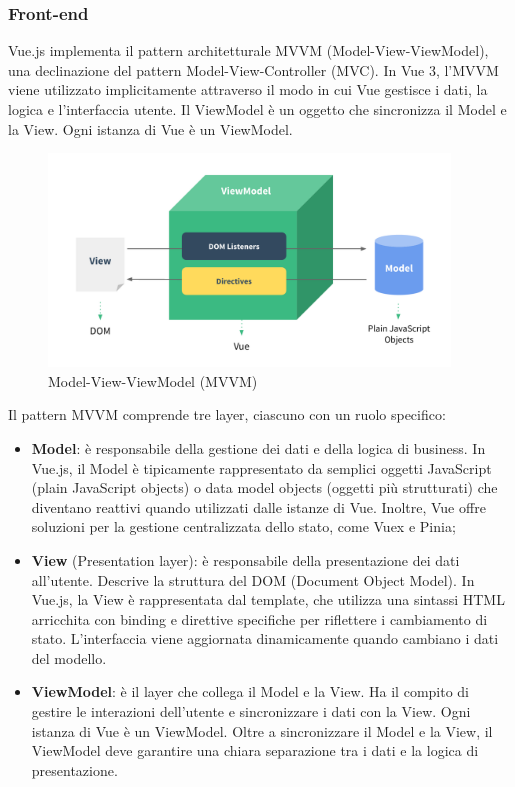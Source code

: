 \subsubsection{Front-end}

\par Vue.js implementa il pattern architetturale MVVM (Model-View-ViewModel), una declinazione del pattern Model-View-Controller (MVC). In Vue 3, l’MVVM viene utilizzato implicitamente attraverso il modo in cui Vue gestisce i dati, la logica e l'interfaccia utente. Il ViewModel è un oggetto che sincronizza il Model e la View. Ogni istanza di Vue è un ViewModel.

\begin{figure}[H]
  \centering
  \includegraphics[width=0.95\textwidth]{assets/Frontend/architettura_mvvm.png}
  \caption{Model-View-ViewModel (MVVM)}
\end{figure}

\par Il pattern MVVM comprende tre layer, ciascuno con un ruolo specifico:
\begin{itemize}
  \item \textbf{Model}: è responsabile della gestione dei dati e della logica di business. In Vue.js, il Model è tipicamente rappresentato da semplici oggetti JavaScript (plain JavaScript objects) o data model objects (oggetti più strutturati) che diventano reattivi quando utilizzati dalle istanze di Vue. Inoltre, Vue offre soluzioni per la gestione centralizzata dello stato, come Vuex e Pinia;
  \item \textbf{View} (Presentation layer): è responsabile della presentazione dei dati all'utente. Descrive la struttura del DOM (Document Object Model). In Vue.js, la View è rappresentata dal template, che utilizza una sintassi HTML arricchita con binding e direttive specifiche per riflettere i cambiamento di stato. L'interfaccia viene aggiornata dinamicamente quando cambiano i dati del modello.
  \item \textbf{ViewModel}: è il layer che collega il Model e la View. Ha il compito di gestire le interazioni dell'utente e sincronizzare i dati con la View. Ogni istanza di Vue è un ViewModel. Oltre a sincronizzare il Model e la View, il ViewModel deve garantire una chiara separazione tra i dati e la logica di presentazione.
\end{itemize} 

